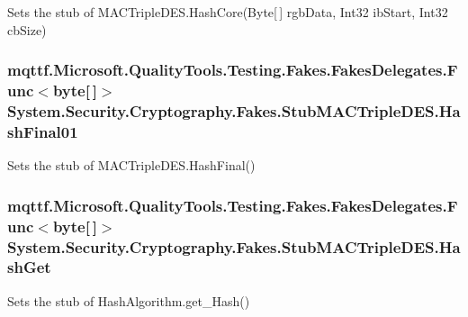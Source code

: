 Sets the stub of M\-A\-C\-Triple\-D\-E\-S.\-Hash\-Core(\-Byte\mbox{[}$\,$\mbox{]} rgb\-Data, Int32 ib\-Start, Int32 cb\-Size)

\hypertarget{class_system_1_1_security_1_1_cryptography_1_1_fakes_1_1_stub_m_a_c_triple_d_e_s_a0e0b5e0e3585649ec3b7770208ad7ea5}{
\subsubsection[{Hash\-Final01}]{\setlength{\rightskip}{0pt plus 5cm}mqttf.\-Microsoft.\-Quality\-Tools.\-Testing.\-Fakes.\-Fakes\-Delegates.\-Func$<$byte\mbox{[}$\,$\mbox{]}$>$ System.\-Security.\-Cryptography.\-Fakes.\-Stub\-M\-A\-C\-Triple\-D\-E\-S.\-Hash\-Final01}}\label{class_system_1_1_security_1_1_cryptography_1_1_fakes_1_1_stub_m_a_c_triple_d_e_s_a0e0b5e0e3585649ec3b7770208ad7ea5}


Sets the stub of M\-A\-C\-Triple\-D\-E\-S.\-Hash\-Final()

\hypertarget{class_system_1_1_security_1_1_cryptography_1_1_fakes_1_1_stub_m_a_c_triple_d_e_s_a5146979f296226d63a3a083eded74c0c}{
\subsubsection[{Hash\-Get}]{\setlength{\rightskip}{0pt plus 5cm}mqttf.\-Microsoft.\-Quality\-Tools.\-Testing.\-Fakes.\-Fakes\-Delegates.\-Func$<$byte\mbox{[}$\,$\mbox{]}$>$ System.\-Security.\-Cryptography.\-Fakes.\-Stub\-M\-A\-C\-Triple\-D\-E\-S.\-Hash\-Get}}\label{class_system_1_1_security_1_1_cryptography_1_1_fakes_1_1_stub_m_a_c_triple_d_e_s_a5146979f296226d63a3a083eded74c0c}


Sets the stub of Hash\-Algorithm.\-get\-\_\-\-Hash()

